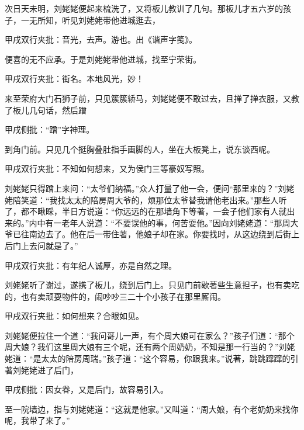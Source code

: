 \begin{parag}
    次日天未明，刘姥姥便起来梳洗了，又将板儿教训了几句。那板儿才五六岁的孩子，一无所知，听见刘姥姥带他进城逛去，\begin{note}甲戌双行夹批：音光，去声。游也。出《谐声字笺》。\end{note}便喜的无不应承。于是刘姥姥带他进城，找至宁荣街。\begin{note}甲戌双行夹批：街名。本地风光，妙！\end{note}来至荣府大门石狮子前，只见簇簇轿马，刘姥姥便不敢过去，且掸了掸衣服，又教了板儿几句话，然后蹭\begin{note}甲戌侧批：“蹭”字神理。\end{note}到角门前。只见几个挺胸叠肚指手画脚的人，坐在大板凳上，说东谈西呢。\begin{note}甲戌双行夹批：不知如何想来，又为侯门三等豪奴写照。\end{note}刘姥姥只得蹭上来问：“太爷们纳福。”众人打量了他一会，便问“那里来的？”刘姥姥陪笑道：“我找太太的陪房周大爷的，烦那位太爷替我请他老出来。”那些人听了，都不瞅睬，半日方说道：“你远远的在那墙角下等著，一会子他们家有人就出来的。”内中有一老年人说道：“不要误他的事，何苦耍他。”因向刘姥姥道：“那周大爷已往南边去了。他在后一带住著，他娘子却在家。你要找时，从这边绕到后街上后门上去问就是了。”\begin{note}甲戌双行夹批：有年纪人诚厚，亦是自然之理。\end{note}
\end{parag}


\begin{parag}
    刘姥姥听了谢过，遂携了板儿，绕到后门上。只见门前歇著些生意担子，也有卖吃的，也有卖顽耍物件的，闹吵吵三二十个小孩子在那里厮闹。\begin{note}甲戌双行夹批：如何想来？合眼如见。\end{note}刘姥姥便拉住一个道：“我问哥儿一声，有个周大娘可在家么？”孩子们道：“那个周大娘？我们这里周大娘有三个呢，还有两个周奶奶，不知是那一行当的？”刘姥姥道：“是太太的陪房周瑞。”孩子道：“这个容易，你跟我来。”说著，跳跳蹿蹿的引著刘姥姥进了后门，\begin{note}甲戌侧批：因女眷，又是后门，故容易引入。\end{note}至一院墙边，指与刘姥姥道：“这就是他家。”又叫道：“周大娘，有个老奶奶来找你呢，我带了来了。”
\end{parag}


